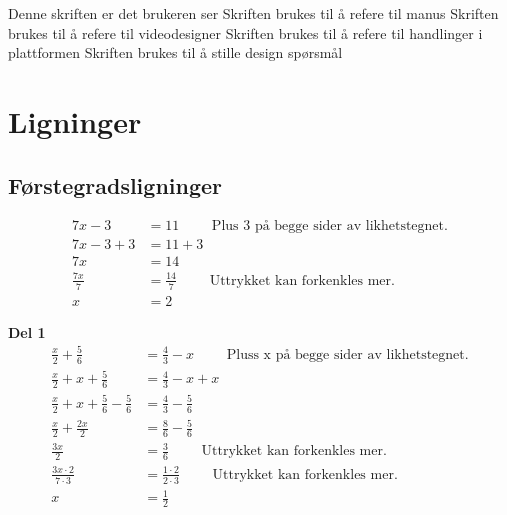 \documentclass[12pt,twoside,onecolumn]{article}
\begin{document}
Denne skriften er det brukeren ser\newline
{\color{gray} Skriften brukes til å refere til manus} \newline
{\color{PineGreen} Skriften brukes til å refere til videodesigner} \newline
{\color{Maroon} Skriften brukes til å refere til handlinger i plattformen} \newline
{\color{Cerulean} Skriften brukes til å stille design spørsmål}

\section*{Ligninger}

\subsection*{Førstegradsligninger}

\begin{Exercise}
\begin{align}
7x - 3 &= 11  \qquad\text{ Plus 3 på begge sider av likhetstegnet.}\\
7x -3 +3 &= 11 + 3\\
7x &= 14\\  
\frac{7x}{7} &=  \frac{14}{7} \qquad\text{ Uttrykket kan forkenkles mer.}\\
x &= 2
\end{align}
\end{Exercise}

\begin{Exercise}
\textbf{Del 1}
\begin{align}
\frac{x}{2} + \frac{5}{6} &=  \frac{4}{3} - x \qquad\text{ Pluss x på begge sider av likhetstegnet.}\\
\frac{x}{2} + x + \frac{5}{6} &=  \frac{4}{3} - x + x\\
\frac{x}{2} + x + \frac{5}{6} - \frac{5}{6} &=  \frac{4}{3} - \frac{5}{6}\\
\frac{x}{2} + \frac{2x}{2} &= \frac{8}{6} - \frac{5}{6}\\
\frac{3x}{2}  &= \frac{3}{6} \qquad\text{ Uttrykket kan forkenkles mer.}\\ 
\frac{3x\cdot2}{7\cdot3} &=  \frac{1\cdot2}{2\cdot3} \qquad\text{ Uttrykket kan forkenkles mer.}\\
x &= \frac{1}{2}
\end{align}
\end{Exercise}
\end{document}
